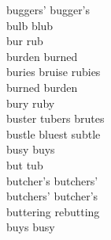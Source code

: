 buggers' bugger's\\
bulb blub\\
bur rub\\
burden burned\\
buries bruise rubies\\
burned burden\\
bury ruby\\
buster tubers brutes\\
bustle bluest subtle\\
busy buys\\
but tub\\
butcher's butchers'\\
butchers' butcher's\\
buttering rebutting\\
buys busy\\

